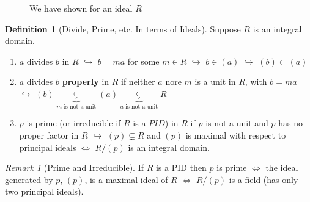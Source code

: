 \documentclass[12pt]{article}
\theoremstyle{definition}
\newtheorem{defn}[thm]{Definition}
\theoremstyle{remark}
\newtheorem{rmk}[thm]{Remark}
\numberwithin{equation}{section}
\newcommand\B[1]{\textbf{ #1}}
\begin{document}
\vspace{15pt}



\begin{figure}[H]
        \centering
        \caption{We have shown for an ideal $R$}
\end{figure}

\vspace{15pt}

\begin{defn}[Divide, Prime, etc. In terms of Ideals]
        Suppose $R$ is an integral domain. \begin{enumerate}
                \item $a$ divides $b$ in $R$ $\hookrightarrow$ $b = ma$ for some $m \in R$ $\hookrightarrow$ $b \in (a)$ $\hookrightarrow$ $(b) \subset (a)$
                \item $a$ divides $b$ \B{properly} in $R$ if neither $a$ nore $m$ is a unit in $R$, with $b = ma$ $\hookrightarrow$ $(b) \underbrace{\subsetneq}_{\text{$m$ is not a unit}} (a) \underbrace{\subsetneq}_{\text{$a$ is not a unit}} R$
                \item $p$ is prime (or irreducible if $R$ is a $PID$) in $R$ if $p$ is not a unit and $p$ has no proper factor in $R$ $\hookrightarrow$ $(p) \subsetneq R$ and $(p)$ is maximal with respect to principal ideals $\iff$ $R/(p)$ is an integral domain.
        \end{enumerate}
\end{defn}

\vspace{15pt}

\begin{rmk}[Prime and Irreducible]
        If $R$ is a PID then $p$ is prime $\iff$ the ideal generated by $p$, $(p)$, is a maximal ideal of $R$ $\iff$ $R/(p)$ is a field (has only two principal ideals).
\end{rmk}

\vspace{15pt}
\end{document}
